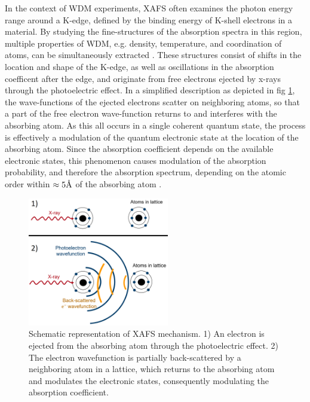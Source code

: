 In the 
context of WDM 
experiments, XAFS often examines the photon energy 
range 
around a 
K-edge, defined by the binding energy of K-shell 
electrons in a material. By studying the fine-structures of 
the absorption spectra in this region, multiple properties of WDM, e.g. density, 
temperature, and coordination of atoms, can be 
simultaneously extracted \citep{levy2010double, 
torchio2016probing, hall1988experimental}. These 
structures 
consist of shifts in the location and 
shape of the K-edge, as well as oscillations in the 
absorption coefficent after the edge, and originate from free electrons ejected by x-rays 
through the photoelectric effect. In a simplified 
description as depicted in fig \ref{XAFS_scheme}, the wave-functions of the ejected electrons scatter on neighboring atoms, so that a 
part of the free electron wave-function returns to 
and interferes with the absorbing atom. As this all 
occurs in a single coherent quantum state, the 
process is effectively a modulation 
of the quantum electronic state at the location of 
the absorbing atom. Since the absorption coefficient 
depends on the available electronic states, this 
phenomenon causes modulation of the absorption 
probability, and therefore the absorption 
spectrum, depending on the atomic order within 
$\approx 5\textup{\AA}$ of the absorbing atom 
\citep{newville2014fundamentals}. 

\begin{figure}
	\centering
	\includegraphics[width = 0.55\textwidth]{Diagrams/XAFS_scheme.PNG}
	\caption{Schematic representation of XAFS mechanism. 1) An electron is 
	ejected from the absorbing atom through the photoelectric effect. 2) The 
	electron wavefunction is partially back-scattered by a neighboring atom 
	in a lattice, which returns to the absorbing atom and modulates the 
	electronic states, consequently modulating the absorption coefficient.}
	\label{XAFS_scheme}
\end{figure}

